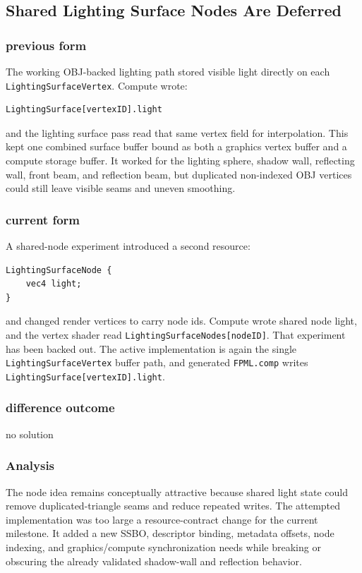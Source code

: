 \subsection{Shared Lighting Surface Nodes Are Deferred}

\subsubsection{previous form}

The working OBJ-backed lighting path stored visible light directly on each
\texttt{LightingSurfaceVertex}.  Compute wrote:
\begin{verbatim}
LightingSurface[vertexID].light
\end{verbatim}
and the lighting surface pass read that same vertex field for interpolation.
This kept one combined surface buffer bound as both a graphics vertex buffer
and a compute storage buffer.  It worked for the lighting sphere, shadow
wall, reflecting wall, front beam, and reflection beam, but duplicated
non-indexed OBJ vertices could still leave visible seams and uneven
smoothing.

\subsubsection{current form}

A shared-node experiment introduced a second resource:
\begin{verbatim}
LightingSurfaceNode {
    vec4 light;
}
\end{verbatim}
and changed render vertices to carry node ids.  Compute wrote shared node
light, and the vertex shader read \texttt{LightingSurfaceNodes[nodeID]}.
That experiment has been backed out.  The active implementation is again the
single \texttt{LightingSurfaceVertex} buffer path, and generated
\texttt{FPML.comp} writes \texttt{LightingSurface[vertexID].light}.

\subsubsection{difference outcome}

no solution

\subsubsection{Analysis}

The node idea remains conceptually attractive because shared light state could
remove duplicated-triangle seams and reduce repeated writes.  The attempted
implementation was too large a resource-contract change for the current
milestone.  It added a new SSBO, descriptor binding, metadata offsets, node
indexing, and graphics/compute synchronization needs while breaking or
obscuring the already validated shadow-wall and reflection behavior.

